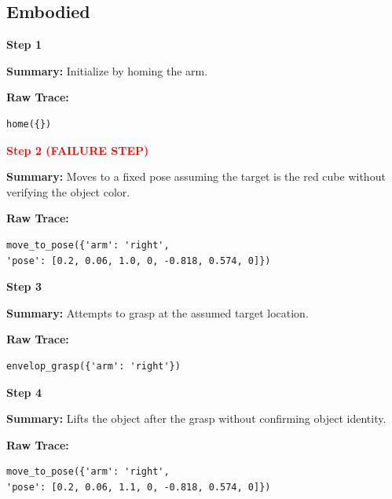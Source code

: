 \documentclass[11pt]{article}
\begin{document}
\subsection{Embodied}



\begin{tcolorbox}[
breakable,
colback=customwhite,
colframe=customgreen,
title=Instruction,
fontupper=\fontfamily{pcr}\selectfont\scriptsize
]

\textbf{Step 1}

\textbf{Summary:}  
Initialize by homing the arm.

\textbf{Raw Trace:}
\begin{verbatim}
home({})
\end{verbatim}

\medskip
\textbf{\textcolor{red}{Step 2 (FAILURE STEP)}}

\textbf{Summary:}  
Moves to a fixed pose assuming the target is the red cube without verifying the object color.

\textbf{Raw Trace:}
\begin{verbatim}
move_to_pose({'arm': 'right',
'pose': [0.2, 0.06, 1.0, 0, -0.818, 0.574, 0]})
\end{verbatim}

\medskip
\textbf{Step 3}

\textbf{Summary:}  
Attempts to grasp at the assumed target location.

\textbf{Raw Trace:}
\begin{verbatim}
envelop_grasp({'arm': 'right'})
\end{verbatim}

\medskip
\textbf{Step 4}

\textbf{Summary:}  
Lifts the object after the grasp without confirming object identity.

\textbf{Raw Trace:}
\begin{verbatim}
move_to_pose({'arm': 'right',
'pose': [0.2, 0.06, 1.1, 0, -0.818, 0.574, 0]})
\end{verbatim}

\end{tcolorbox}

\end{document}
